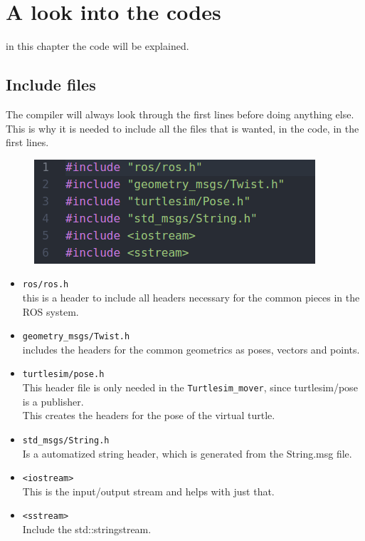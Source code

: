 \chapter{A look into the codes} \label{ch:lookinto}

in this chapter the code will be explained.

\section{Include files} 

The compiler will always look through the first lines before doing anything else. This is why it is needed to include all the files that is wanted, in the code, in the first lines.\\

\begin{figure}[h]
\includegraphics[width=.5\textwidth]{figures/therealinclude.png}
\end{figure}\label{fig:include}

\begin{itemize}
\item \texttt{ros/ros.h}\\
this is a header to include all headers necessary for the common pieces in the ROS system.\\
\item \texttt{geometry\_msgs/Twist.h}\\
includes the headers for the common geometrics as poses, vectors and points.\\
\item \texttt{turtlesim/pose.h}\\
This header file is only needed in the \texttt{Turtlesim\_mover}, since turtlesim/pose is a publisher.\\
This creates the headers for the pose of the virtual turtle.\\
\item \texttt{std\_msgs/String.h}\\
Is a automatized string header, which is generated from the String.msg file.\\
\item \texttt{<iostream>}\\
This is the input/output stream and helps with just that.\\
\item \texttt{<sstream>}\\
Include the std::stringstream.\\

\end{itemize}

